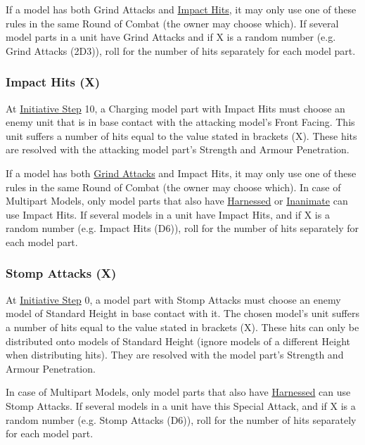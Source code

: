 If a model has both Grind Attacks and \hyperref[impact_hits]{Impact Hits}, it may only use one of these rules in the same Round of Combat (the owner may choose which). If several model parts in a unit have Grind Attacks and if X is a random number (e.g. Grind Attacks (2D3)), roll for the number of hits separately for each model part.

\subsubsection{Impact Hits (X)}
\idx[main=y]{\impacthits{}}\label{impact_hits}

At \hyperref[initiative_order]{Initiative Step} 10, a Charging model part with Impact Hits must choose an enemy unit that is in base contact with the attacking model's Front Facing. This unit suffers a number of hits equal to the value stated in brackets (X). These hits are resolved with the attacking model part's Strength and Armour Penetration.

If a model has both \hyperref[grind_attacks]{Grind Attacks} and Impact Hits, it may only use one of these rules in the same Round of Combat (the owner may choose which). In case of Multipart Models, only model parts that also have \hyperref[harnessed]{Harnessed} or \hyperref[inanimate]{Inanimate} can use Impact Hits. If several models in a unit have Impact Hits, and if X is a random number (e.g. Impact Hits (D6)), roll for the number of hits separately for each model part.

\subsubsection{Stomp Attacks (X)}
\idx[main=y]{\stompattacks{}}\label{stomp_attacks}

At \hyperref[initiative_order]{Initiative Step} 0, a model part with Stomp Attacks must choose an enemy model of Standard Height in base contact with it. The chosen model's unit suffers a number of hits equal to the value stated in brackets (X). These hits can only be distributed onto models of Standard Height (ignore models of a different Height when distributing hits). They are resolved with the model part's Strength and Armour Penetration.

In case of Multipart Models, only model parts that also have \hyperref[harnessed]{Harnessed} can use Stomp Attacks. If several models in a unit have this Special Attack, and if X is a random number (e.g. Stomp Attacks (D6)), roll for the number of hits separately for each model part.

